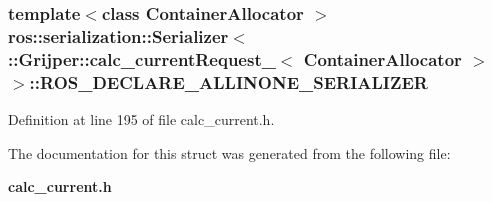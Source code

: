 \subsubsection[{R\-O\-S\-\_\-\-D\-E\-C\-L\-A\-R\-E\-\_\-\-A\-L\-L\-I\-N\-O\-N\-E\-\_\-\-S\-E\-R\-I\-A\-L\-I\-Z\-E\-R}]{\setlength{\rightskip}{0pt plus 5cm}template$<$class Container\-Allocator $>$ ros\-::serialization\-::\-Serializer$<$ \-::{\bf Grijper\-::calc\-\_\-current\-Request\-\_\-}$<$ Container\-Allocator $>$ $>$\-::R\-O\-S\-\_\-\-D\-E\-C\-L\-A\-R\-E\-\_\-\-A\-L\-L\-I\-N\-O\-N\-E\-\_\-\-S\-E\-R\-I\-A\-L\-I\-Z\-E\-R}\label{structros_1_1serialization_1_1Serializer_3_01_1_1Grijper_1_1calc__currentRequest___3_01ContainerAllocator_01_4_01_4_a5b4b89dc185ab09200365a0f33f77351}


Definition at line 195 of file calc\-\_\-current.\-h.



The documentation for this struct was generated from the following file\-:\begin{DoxyCompactItemize}
\item 
{\bf calc\-\_\-current.\-h}\end{DoxyCompactItemize}
